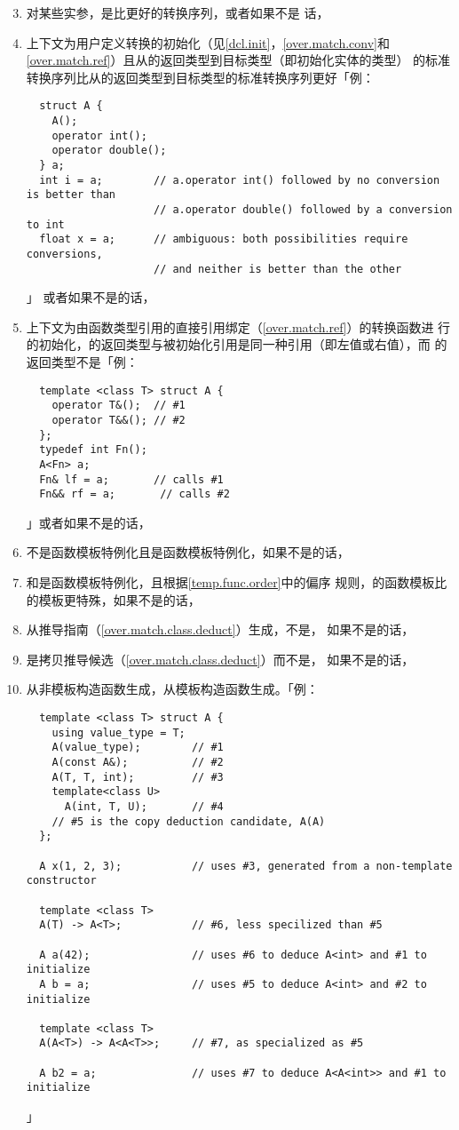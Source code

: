 \begin{enumerate}
  \setcounter{enumi}{2}
  \item{对某些实参，是比更好的转换序列，或者如果不是
    话，}
  \item{上下文为用户定义转换的初始化（见\ref{dcl.init}，\ref{over.match.conv}和
    \ref{over.match.ref}）且从的返回类型到目标类型（即初始化实体的类型）
    的标准转换序列比从的返回类型到目标类型的标准转换序列更好「例：
\begin{lstlisting}
  struct A {
    A();
    operator int();
    operator double();
  } a;
  int i = a;        // a.operator int() followed by no conversion is better than
                    // a.operator double() followed by a conversion to int
  float x = a;      // ambiguous: both possibilities require conversions,
                    // and neither is better than the other
\end{lstlisting}」
    或者如果不是的话，}
  \item{上下文为由函数类型引用的直接引用绑定（\ref{over.match.ref}）的转换函数进
    行的初始化，的返回类型与被初始化引用是同一种引用（即左值或右值），而
    的返回类型不是「例：
\begin{lstlisting}
  template <class T> struct A {
    operator T&();  // #1
    operator T&&(); // #2
  };
  typedef int Fn();
  A<Fn> a;
  Fn& lf = a;       // calls #1
  Fn&& rf = a;       // calls #2
\end{lstlisting}」或者如果不是的话，}
    \item{不是函数模板特例化且是函数模板特例化，如果不是的话，}
    \item{和是函数模板特例化，且根据\ref{temp.func.order}中的偏序
      规则，的函数模板比的模板更特殊，如果不是的话，}
    \item{从推导指南（\ref{over.match.class.deduct}）生成，不是，
      如果不是的话，}
    \item{是拷贝推导候选（\ref{over.match.class.deduct}）而不是，
      如果不是的话，}
    \item{从非模板构造函数生成，从模板构造函数生成。「例：
\begin{lstlisting}
  template <class T> struct A {
    using value_type = T;
    A(value_type);        // #1
    A(const A&);          // #2
    A(T, T, int);         // #3
    template<class U>
      A(int, T, U);       // #4
    // #5 is the copy deduction candidate, A(A)
  };

  A x(1, 2, 3);           // uses #3, generated from a non-template constructor

  template <class T>
  A(T) -> A<T>;           // #6, less specilized than #5

  A a(42);                // uses #6 to deduce A<int> and #1 to initialize
  A b = a;                // uses #5 to deduce A<int> and #2 to initialize

  template <class T>
  A(A<T>) -> A<A<T>>;     // #7, as specialized as #5

  A b2 = a;               // uses #7 to deduce A<A<int>> and #1 to initialize
\end{lstlisting}」
    }
\end{enumerate}
